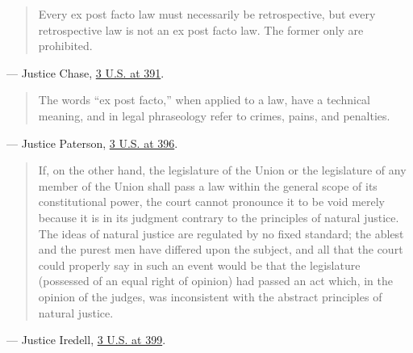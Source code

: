 \documentclass[12pt]{article}
\begin{document}
\begin{quote}
Every ex post facto law must necessarily be retrospective, but every retrospective law is not an ex post facto law. The former only are prohibited.
\end{quote}
\noindent --- Justice Chase, \href{https://supreme.justia.com/cases/federal/us/3/386/}{3 U.S. at 391}.

\begin{quote}
The words ``ex post facto,'' when applied to a law, have a technical meaning, and in legal phraseology refer to crimes, pains, and penalties.
\end{quote}
\noindent --- Justice Paterson, \href{https://supreme.justia.com/cases/federal/us/3/386/}{3 U.S. at 396}.

\begin{quote}
If, on the other hand, the legislature of the Union or the legislature of any member of the Union shall pass a law within the general scope of its constitutional power, the court cannot pronounce it to be void merely because it is in its judgment contrary to the principles of natural justice. The ideas of natural justice are regulated by no fixed standard; the ablest and the purest men have differed upon the subject, and all that the court could properly say in such an event would be that the legislature (possessed of an equal right of opinion) had passed an act which, in the opinion of the judges, was inconsistent with the abstract principles of natural justice.
\end{quote}
\noindent --- Justice Iredell, \href{https://supreme.justia.com/cases/federal/us/3/386/}{3 U.S. at 399}.
\end{document}
